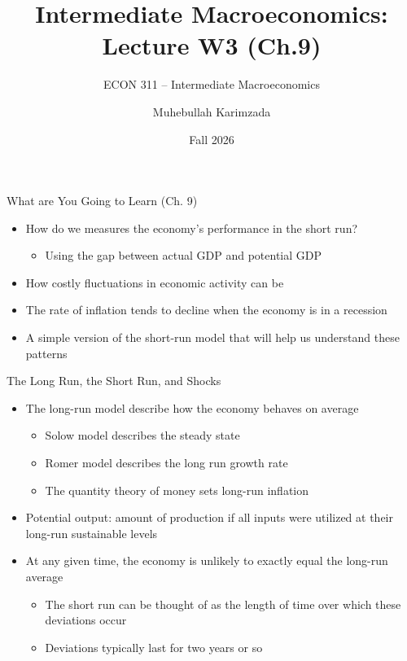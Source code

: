 \documentclass[aspectratio=1610]{beamer}
\title[Winter - Lecture 3] %
{Intermediate Macroeconomics: Lecture  W3 (Ch.9)}
\subtitle{ECON 311 -- Intermediate Macroeconomics}
\author{Muhebullah Karimzada}
\institute{School of Economics \\\ University of Northern British Columbia}
\date{Fall 2026}
\begin{document}
\begin{frame}[plain]
  \titlepage
\end{frame}

\begin{frame}[wide]{What are You Going to Learn (Ch. 9)}
	\begin{itemize}
		\item How do we measures the economy’s performance in the short run? 
		\begin{itemize}
			\item Using the gap between actual GDP and potential GDP
		\end{itemize}
		\item How costly fluctuations in economic activity can be
		\item The rate of inflation tends to decline when the economy is in a recession
		\item A simple version of the short-run model that will help us understand these patterns
	\end{itemize}
\end{frame}

\begin{frame}[wide]{The Long Run, the Short Run, and Shocks}
	\begin{itemize}
		\item The long-run model describe how the economy behaves on average
			\begin{itemize}
				\item Solow model describes the steady state
				\item Romer model describes the long run growth rate
				\item The quantity theory of money sets long-run inflation
			\end{itemize}
		\item Potential output: amount of production if all inputs were utilized at their long-run sustainable levels
		\item At any given time, the economy is unlikely to exactly equal the long-run average
		\begin{itemize}
			\item The short run can be thought of as the length of time over which these deviations occur
			\item Deviations typically last for two years or so
		\end{itemize}
	\end{itemize}
\end{frame}
\end{document}
